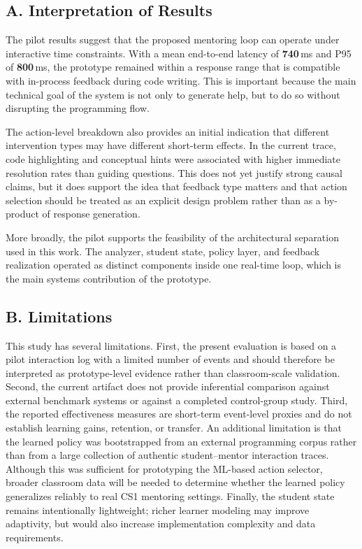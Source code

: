\documentclass[conference]{IEEEtran}
\begin{document}
\subsection*{A. Interpretation of Results}

The pilot results suggest that the proposed mentoring loop can operate under interactive time constraints. With a mean end-to-end latency of \textbf{740}\,ms and P95 of \textbf{800}\,ms, the prototype remained within a response range that is compatible with in-process feedback during code writing. This is important because the main technical goal of the system is not only to generate help, but to do so without disrupting the programming flow.

The action-level breakdown also provides an initial indication that different intervention types may have different short-term effects. In the current trace, code highlighting and conceptual hints were associated with higher immediate resolution rates than guiding questions. This does not yet justify strong causal claims, but it does support the idea that feedback type matters and that action selection should be treated as an explicit design problem rather than as a by-product of response generation.

More broadly, the pilot supports the feasibility of the architectural separation used in this work. The analyzer, student state, policy layer, and feedback realization operated as distinct components inside one real-time loop, which is the main systems contribution of the prototype.

\subsection*{B. Limitations}

This study has several limitations. First, the present evaluation is based on a pilot interaction log with a limited number of events and should therefore be interpreted as prototype-level evidence rather than classroom-scale validation. Second, the current artifact does not provide inferential comparison against external benchmark systems or against a completed control-group study. Third, the reported effectiveness measures are short-term event-level proxies and do not establish learning gains, retention, or transfer. An additional limitation is that the learned policy was bootstrapped from an external programming corpus rather than from a large collection of authentic student--mentor interaction traces. Although this was sufficient for prototyping the ML-based action selector, broader classroom data will be needed to determine whether the learned policy generalizes reliably to real CS1 mentoring settings. Finally, the student state remains intentionally lightweight; richer learner modeling may improve adaptivity, but would also increase implementation complexity and data requirements.
\end{document}
